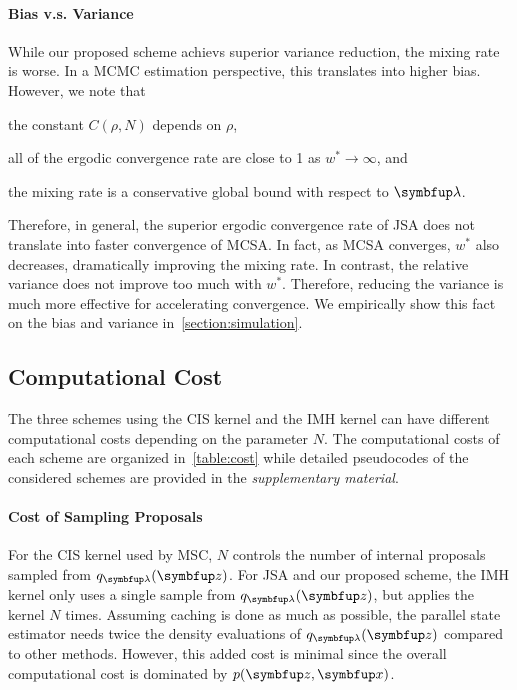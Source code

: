 \paragraph{Bias v.s. Variance}
While our proposed scheme achievs superior variance reduction, the mixing rate is worse.
In a MCMC estimation perspective, this translates into higher bias.
However, we note that
\begin{enumerate*}[label=\textbf{(\roman*)}]
  \item the constant \(C\left(\rho, N\right)\) depends on \(\rho\), 
  \item all of the ergodic convergence rate are close to 1 as \(w^* \rightarrow \infty\), and
  \item the mixing rate is a conservative global bound with respect to \(\vlambda\).
\end{enumerate*}
Therefore, in general, the superior ergodic convergence rate of JSA does not translate into faster convergence of MCSA.
In fact, as MCSA converges, \(w^*\) also decreases, dramatically improving the mixing rate.
In contrast, the relative variance does not improve too much with \(w^*\).
Therefore, reducing the variance is much more effective for accelerating convergence.
We empirically show this fact on the bias and variance in~\cref{section:simulation}.

\begin{wraptable}{r}{0.6\textwidth}
  \vspace{-0.5in}
  
  \vspace{-0.2in}
\end{wraptable}
%
\subsection{Computational Cost}
The three schemes using the CIS kernel and the IMH kernel can have different computational costs depending on the parameter \(N\).
The computational costs of each scheme are organized in~\cref{table:cost} while detailed pseudocodes of the considered schemes are provided in the \textit{supplementary material}.

\vspace{-0.05in}
\paragraph{Cost of Sampling Proposals}
For the CIS kernel used by MSC, \(N\) controls the number of internal proposals sampled from \(q_{\vlambda}(\vz)\).
For JSA and our proposed scheme, the IMH kernel only uses a single sample from \(q_{\vlambda}(\vz)\), but applies the kernel \(N\) times.
Assuming caching is done as much as possible, the parallel state estimator needs twice the density evaluations of \(q_{\vlambda}(\vz)\) compared to other methods.
However, this added cost is minimal since the overall computational cost is dominated by  \(p(\vz,\vx)\).

